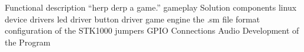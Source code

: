 Functional description
	``herp derp a game.''
	gameplay
Solution components
	linux device drivers
		led driver
		button driver
	game engine
	the .sm file format
configuration of the STK1000
	jumpers
	GPIO Connections
	Audio
Development of the Program
